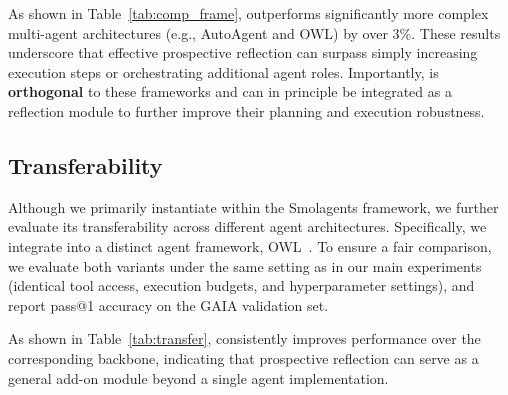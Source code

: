 As shown in Table~\ref{tab:comp_frame}, \method outperforms significantly more complex multi-agent architectures (e.g., AutoAgent and OWL) by over $3\%$. These results underscore that effective prospective reflection can surpass simply increasing execution steps or orchestrating additional agent roles. Importantly, \method is \textbf{orthogonal} to these frameworks and can in principle be integrated as a reflection module to further improve their planning and execution robustness.


\subsection{Transferability}
Although we primarily instantiate \method within the Smolagents framework, we further evaluate its transferability across different agent architectures. Specifically, we integrate \method into a distinct agent framework, OWL~\citep{hu2025owl}. To ensure a fair comparison, we evaluate both variants under the same setting as in our main experiments (identical tool access, execution budgets, and hyperparameter settings), and report pass@1 accuracy on the GAIA validation set.



\begin{table}[ht]
    \caption{Transferability results across different agentic systems.}
    \label{tab:transfer}
    \centering
    \vspace{-5pt}
\end{table}



As shown in Table~\ref{tab:transfer}, \method consistently improves performance over the corresponding backbone, indicating that prospective reflection can serve as a general add-on module beyond a single agent implementation.


